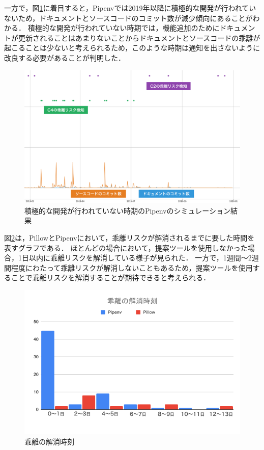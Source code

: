 一方で，図\ref{simpipenv}に着目すると，Pipenvでは2019年以降に積極的な開発が行われていないため，ドキュメントとソースコードのコミット数が減少傾向にあることがわかる．
積極的な開発が行われていない時期では，機能追加のためにドキュメントが更新されることはあまりないことからドキュメントとソースコードの乖離が起こることは少ないと考えられるため，このような時期は通知を出さないように改良する必要があることが判明した．
\begin{figure}[H]
    \centering
    \includegraphics[width=12cm]{images/pipenv.png}
    \caption{積極的な開発が行われていない時期のPipenvのシミュレーション結果}
    \label{simpipenv}
\end{figure}

図\ref{time}は，PillowとPipenvにおいて，乖離リスクが解消されるまでに要した時間を表すグラフである．
ほとんどの場合において，提案ツールを使用しなかった場合，1日以内に乖離リスクを解消している様子が見られた．
一方で，1週間〜2週間程度にわたって乖離リスクが解消しないこともあるため，提案ツールを使用することで乖離リスクを解消することが期待できると考えられる．
\begin{figure}[H]
    \centering
    \includegraphics[width=12cm]{images/time.png}
    \caption{乖離の解消時刻}
    \label{time}
\end{figure}

